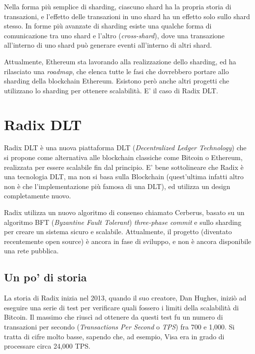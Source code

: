 Nella forma più semplice di sharding, ciascuno shard ha la propria storia di transazioni, e l'effetto delle transazioni in uno shard ha un effetto solo sullo shard stesso. In forme più avanzate di sharding esiste una qualche forma di comunicazione tra uno shard e l'altro (\textit{cross-shard}), dove una transazione all'interno di uno shard può generare eventi all'interno di altri shard.

Attualmente, Ethereum sta lavorando alla realizzazione dello sharding, ed ha rilasciato una \textit{roadmap}, che elenca tutte le fasi che dovrebbero portare allo sharding della blockchain Ethereum. Esistono però anche altri progetti che utilizzano lo sharding per ottenere scalabilità. E' il caso di Radix DLT.

\section{Radix DLT}

Radix DLT è una nuova piattaforma DLT (\textit{Decentralized Ledger Technology}) che si propone come alternativa alle blockchain classiche come Bitcoin o Ethereum, realizzata per essere scalabile fin dal principio. E' bene sottolineare che Radix è una tecnologia DLT, ma non si basa sulla Blockchain (quest'ultima infatti altro non è che l'implementazione più famosa di una DLT), ed utilizza un design completamente nuovo.

Radix utilizza un nuovo algoritmo di consenso chiamato Cerberus, basato su un algoritmo BFT (\textit{Byzantine Fault Tolerant}) \textit{three-phase commit} e sullo sharding per creare un sistema sicuro e scalabile. Attualmente, il progetto (diventato recentemente open source) è ancora in fase di sviluppo, e non è ancora disponibile una rete pubblica.

\subsection{Un po' di storia}

La storia di Radix inizia nel 2013, quando il suo creatore, Dan Hughes, iniziò ad eseguire una serie di test per verificare quali fossero i limiti della scalabilità di Bitcoin. Il massimo che riuscì ad ottenere da questi test fu un numero di transazioni per secondo (\textit{Transactions Per Second} o \textit{TPS}) fra 700 e 1,000. Si tratta di cifre molto basse, sapendo che, ad esempio, Visa era in grado di processare circa 24,000 TPS. 

